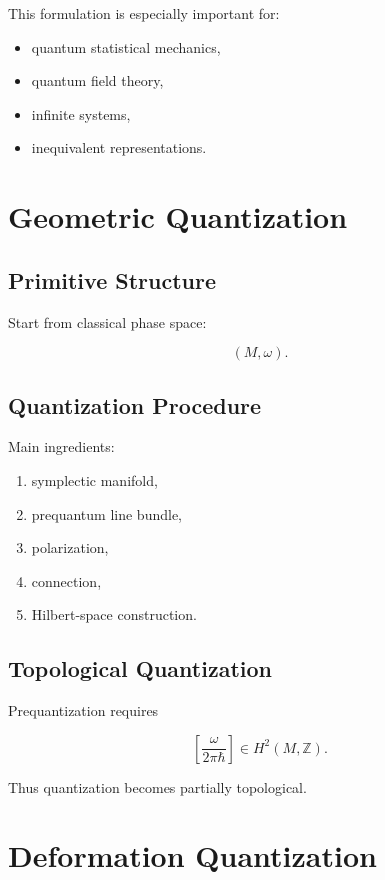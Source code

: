 \documentclass[11pt]{article}
\begin{document}
This formulation is especially important for:

\begin{itemize}
\item quantum statistical mechanics,
\item quantum field theory,
\item infinite systems,
\item inequivalent representations.
\end{itemize}

\section{Geometric Quantization}

\subsection{Primitive Structure}

Start from classical phase space:

\[
(M,\omega).
\]

\subsection{Quantization Procedure}

Main ingredients:

\begin{enumerate}
\item symplectic manifold,
\item prequantum line bundle,
\item polarization,
\item connection,
\item Hilbert-space construction.
\end{enumerate}

\subsection{Topological Quantization}

Prequantization requires

\[
\left[\frac{\omega}{2\pi\hbar}\right]
\in
H^2(M,\mathbb Z).
\]

Thus quantization becomes partially topological.

\section{Deformation Quantization}
\end{document}
